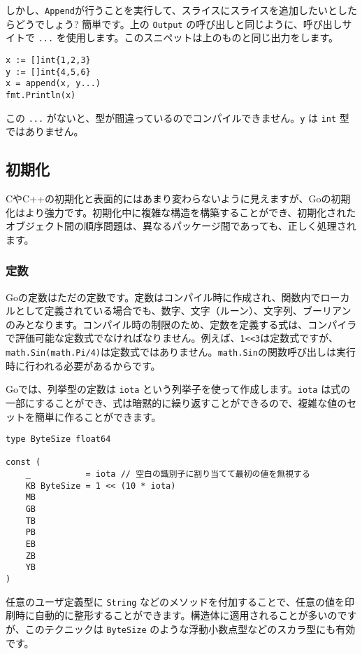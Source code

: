 \documentclass{jsarticle}
\begin{document}
しかし、\texttt{Append}が行うことを実行して、スライスにスライスを追加したいとしたらどうでしょう?
簡単です。上の \texttt{Output} の呼び出しと同じように、呼び出しサイトで
\texttt{...} を使用します。このスニペットは上のものと同じ出力をします。

\begin{lstlisting}[numbers=none]
x := []int{1,2,3}
y := []int{4,5,6}
x = append(x, y...)
fmt.Println(x)
\end{lstlisting}

この \texttt{...}
がないと、型が間違っているのでコンパイルできません。\texttt{y} は
\texttt{int} 型ではありません。

\subsection{初期化}

CやC++の初期化と表面的にはあまり変わらないように見えますが、Goの初期化はより強力です。初期化中に複雑な構造を構築することができ、初期化されたオブジェクト間の順序問題は、異なるパッケージ間であっても、正しく処理されます。

\subsubsection{定数}

Goの定数はただの定数です。定数はコンパイル時に作成され、関数内でローカルとして定義されている場合でも、数字、文字（ルーン）、文字列、ブーリアンのみとなります。コンパイル時の制限のため、定数を定義する式は、コンパイラで評価可能な定数式でなければなりません。例えば、\texttt{1\textless{}\textless{}3}は定数式ですが、\texttt{math.Sin(math.Pi/4)}は定数式ではありません。\texttt{math.Sin}の関数呼び出しは実行時に行われる必要があるからです。

Goでは、列挙型の定数は \texttt{iota}
という列挙子を使って作成します。\texttt{iota}
は式の一部にすることができ、式は暗黙的に繰り返すことができるので、複雑な値のセットを簡単に作ることができます。

\begin{lstlisting}[numbers=none]
type ByteSize float64

const (
    _           = iota // 空白の識別子に割り当てて最初の値を無視する
    KB ByteSize = 1 << (10 * iota)
    MB
    GB
    TB
    PB
    EB
    ZB
    YB
)
\end{lstlisting}

任意のユーザ定義型に \texttt{String}
などのメソッドを付加することで、任意の値を印刷時に自動的に整形することができます。構造体に適用されることが多いのですが、このテクニックは
\texttt{ByteSize} のような浮動小数点型などのスカラ型にも有効です。
\end{document}
